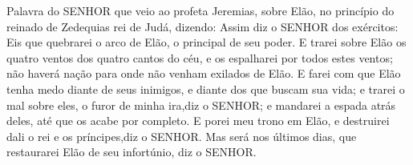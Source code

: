 {Palavra do SENHOR que veio ao profeta Jeremias, sobre Elão, no princípio do reinado de Zedequias rei de Judá, dizendo:
Assim diz o SENHOR dos exércitos: Eis que quebrarei o arco de Elão, o principal de seu poder.
E trarei sobre Elão os quatro ventos dos quatro cantos do céu, e os espalharei por todos estes ventos; não haverá nação para onde não venham exilados de Elão.
E farei com que Elão tenha medo diante de seus inimigos, e diante dos que buscam
{} sua vida;
 e trarei o mal
 sobre eles, o furor de minha ira,diz o SENHOR; e mandarei a espada atrás deles, até que os acabe por completo.
E porei meu trono em Elão, e destruirei dali o rei e os príncipes,diz o SENHOR.
Mas será nos últimos dias, que restaurarei Elão de seu infortúnio, diz o SENHOR.

\par }

